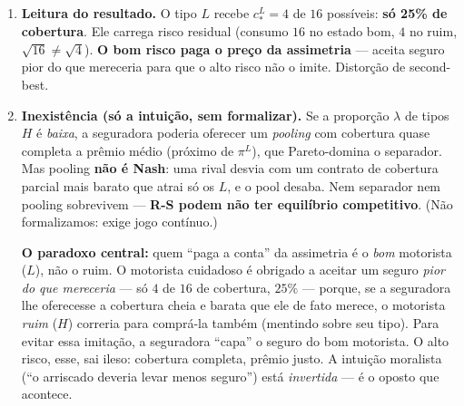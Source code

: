 \documentclass[11pt,a4paper]{article}
\begin{document}
\begin{enumerate}[leftmargin=2em,itemsep=4pt]
\begin{empalavras}[O truque do $\sqrt{A}-\sqrt{B}$ e por que dá para ``chutar'' $c = 4$]
\smallskip\noindent
\textbf{E o ``chute'' $c = 4$?} Não é mágica nem sorte: os números $W = 17$, $L = 16$ foram
escolhidos pelo professor \emph{de propósito} para que a resposta caísse num inteiro redondo
e a verificação fosse instantânea. Substituir $c = 4$ dá $A = 16$ e $B = 4$, com $\sqrt{16}
+ \sqrt{4} = 4 + 2 = 6$ — bate na hora. Para o aluno cético que não confia em chute, o
parágrafo acima mostra o caminho ``oficial'': montar a equação do segundo grau $c^2 - 68c +
256 = 0$ e resolvê-la pela fórmula de Bhaskara. As duas rotas chegam ao mesmo $c = 4$ (a
outra raiz, $64$, é descartada porque a cobertura não pode passar do tamanho do sinistro,
$c \le L = 16$).
\end{empalavras}

\item \textbf{Leitura do resultado.} O tipo $L$ recebe $c^L_\ast = 4$ de $16$ possíveis:
\textbf{só 25\% de cobertura}. Ele carrega risco residual (consumo $16$ no estado bom,
$4$ no ruim, $\sqrt{16}\ne\sqrt{4}$). \textbf{O bom risco paga o preço da assimetria} —
aceita seguro pior do que mereceria para que o alto risco não o imite. Distorção de
second-best.

\item \textbf{Inexistência (só a intuição, sem formalizar).} Se a proporção $\lambda$ de
tipos $H$ é \emph{baixa}, a seguradora poderia oferecer um \emph{pooling} com cobertura
quase completa a prêmio médio (próximo de $\pi^L$), que Pareto-domina o separador. Mas
pooling \textbf{não é Nash}: uma rival desvia com um contrato de cobertura parcial mais
barato que atrai só os $L$, e o pool desaba. Nem separador nem pooling sobrevivem —
\textbf{R-S podem não ter equilíbrio competitivo}. (Não formalizamos: exige jogo contínuo.)

\begin{empalavras}
\textbf{O paradoxo central:} quem ``paga a conta'' da assimetria é o \emph{bom} motorista
($L$), não o ruim. O motorista cuidadoso é obrigado a aceitar um seguro \emph{pior do que
mereceria} — só $4$ de $16$ de cobertura, $25\%$ — porque, se a seguradora lhe oferecesse a
cobertura cheia e barata que ele de fato merece, o motorista \emph{ruim} ($H$) correria para
comprá-la também (mentindo sobre seu tipo). Para evitar essa imitação, a seguradora ``capa''
o seguro do bom motorista. O alto risco, esse, sai ileso: cobertura completa, prêmio justo.
A intuição moralista (``o arriscado deveria levar menos seguro'') está \emph{invertida} —
é o oposto que acontece.


\end{empalavras}
\end{enumerate}
\end{document}
